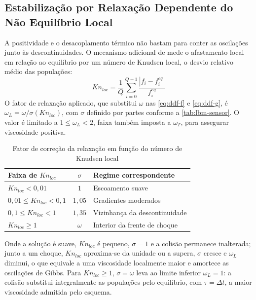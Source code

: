 
\subsection{Estabilização por Relaxação Dependente do Não Equilíbrio Local}\label{subsec:lbm-sensor}

A positividade e o desacoplamento térmico não bastam para conter as oscilações junto às descontinuidades.
O mecanismo adicional de \textcite{Tran2022} mede o afastamento local em relação ao equilíbrio por um número de Knudsen local, o desvio relativo médio das populações:
\begin{equation}\label{eq:knudsen-local}
    Kn_{loc} = \frac{1}{Q} \sum_{i=0}^{Q-1} \frac{\left| f_i - f_i^{eq} \right|}{f_i^{eq}}
\end{equation}
O fator de relaxação aplicado, que substitui $\omega$ nas \eqref{eq:ddf-f} e \eqref{eq:ddf-g}, é $\omega_L = \omega / \sigma(Kn_{loc})$, com $\sigma$ definido por partes conforme a \autoref{tab:lbm-sensor}.
O valor é limitado a $1 \le \omega_L < 2$, faixa também imposta a $\omega_T$, para assegurar viscosidade positiva.

\begin{table}[H]
    \centering
    \caption{Fator de correção da relaxação em função do número de Knudsen local}
    \label{tab:lbm-sensor}
    \begin{tabular}{lcl}
        \toprule
        Faixa de $Kn_{loc}$        & $\sigma$ & Regime correspondente        \\
        \midrule
        $Kn_{loc} < 0{,}01$          & $1$      & Escoamento suave             \\
        $0{,}01 \le Kn_{loc} < 0{,}1$  & $1{,}05$   & Gradientes moderados         \\
        $0{,}1 \le Kn_{loc} < 1$     & $1{,}35$   & Vizinhança da descontinuidade \\
        $Kn_{loc} \ge 1$           & $\omega$ & Interior da frente de choque \\
        \bottomrule
    \end{tabular}
\end{table}

Onde a solução é suave, $Kn_{loc}$ é pequeno, $\sigma = 1$ e a colisão permanece inalterada; junto a um choque, $Kn_{loc}$ aproxima-se da unidade ou a supera, $\sigma$ cresce e $\omega_L$ diminui, o que equivale a uma viscosidade localmente maior e amortece as oscilações de Gibbs.
Para $Kn_{loc} \ge 1$, $\sigma = \omega$ leva ao limite inferior $\omega_L = 1$: a colisão substitui integralmente as populações pelo equilíbrio, com $\tau = \Delta t$, a maior viscosidade admitida pelo esquema.


